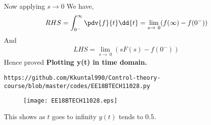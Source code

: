 \begin{enumerate}[label=\thesection.\arabic*.,ref=\thesection.\theenumi]
Now applying $ s \to 0$
We have,
\begin{align}
 RHS =\int_{0^-}^{\infty} \pdv{f}{t}\dd{t} = \lim_{s\to\ 0}(f(\infty) - f(0^{-})) 
\end{align}
And
\begin{align}
    LHS= \lim_{s\to\ 0}(sF(s)-f(0^{-}))
\end{align}
Hence proved
\newline
\newline
\textbf{Plotting y(t) in time domain.}
\begin{lstlisting}
https://github.com/Kkuntal990/Control-theory-course/blob/master/codes/EE18BTECH11028.py
\end{lstlisting}
\begin{figure}[!h]
  \texttt{[image: EE18BTECH11028.eps]}
\end{figure}

This shows as $t$ goes to infinity $y(t)$ tends to 0.5.
\end{enumerate}
